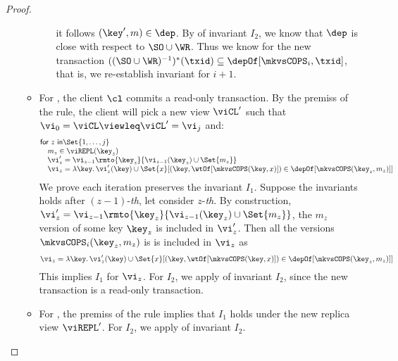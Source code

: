 \begin{proof}
\begin{itemize}
\begin{itemize}
\begin{itemize}
\[                    \] 
                    it follows \( (\key',m) \in \dep \).
                    By \ih of invariant \( I_2 \), we know that  \( \dep \) is close with respect to \( \SO \cup \WR \).
                    Thus we know for the new transaction \( ((\SO \cup \WR)^{-1})^*(\txid) \subseteq \depOf[\mkvsCOPS_i,\txid] \),
                    that is, we re-establish invariant for \( i+1 \).
                \end{itemize}
                \item 
                For , the client \( \cl \) commits a read-only transaction.
                By the premiss of the rule, the client will pick a new view \( \viCL' \)
                such that \( \vi_0 = \viCL \viewleq \viCL' = \vi_j \) and:
                \[
                    {\begin{array}{@{}l@{}}
                        \mathsf{for} \ z \ \mathsf{in} \Set{1, \dots, j} \\
                        \quad m_z \in \viREPL(\key_z) \\
                        \quad \vi'_z = \vi_{z-1}\rmto{\key_z}{\vi_{z-1}(\key_z) \cup \Set{m_z}}  \\
                        \quad \vi_z = \lambda \key \ldotp \vi'_z(\key) \cup \Set{x}[(\key,\wtOf[\mkvsCOPS(\key,x)]) \in \depOf[\mkvsCOPS(\key_z,m_z)]]  \\
                    \end{array}}
                \]
                We prove each iteration preserves the invariant \( I_1 \).
                Suppose the invariants holds after \((z-1)\)-\emph{th}, let consider \(z\)-\emph{th}.
                By construction, \( \vi'_z = \vi_{z-1}\rmto{\key_z}{\vi_{z-1}(\key_z) \cup \Set{m_z}} \),
                the \( m_z \) version of some key \( \key_z \) is included in \( \vi'_z \).
                Then all the versions \( \mkvsCOPS_i(\key_z, m_z) \) is is included in \( \vi_z \) as 
                \[
                     \vi_z = \lambda \key \ldotp \vi'_z(\key) \cup \Set{x}[(\key,\wtOf[\mkvsCOPS(\key,x)]) \in \depOf[\mkvsCOPS(\key_z,m_z)]] 
                \]
                This implies \( I_1 \) for \( \vi_z \).
                For \( I_2 \), we apply \ih of invariant \( I_2 \),
                since the new transaction is a read-only transaction.
            \item For , the premiss of the rule implies that \( I_1 \) holds under the new replica view \( \viREPL' \).
            For \( I_2 \), we apply \ih of invariant \( I_2 \).
            \end{itemize}
    \end{itemize}
\end{proof}

